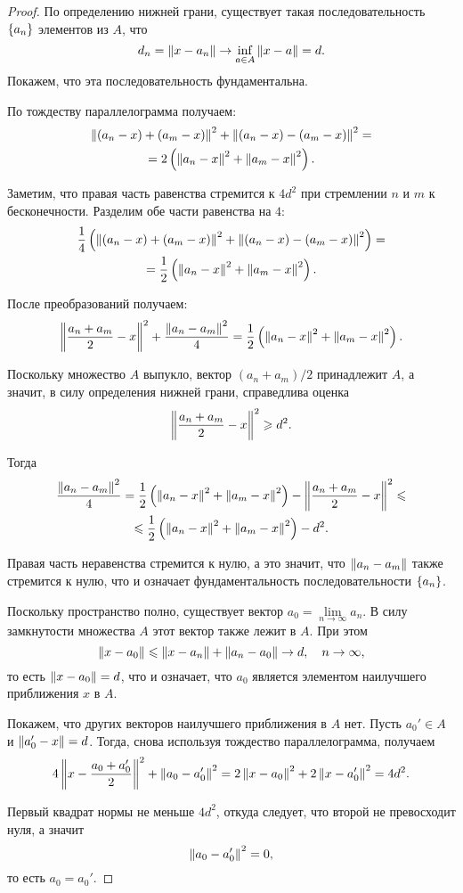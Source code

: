 \begin{proof}
    По определению нижней грани, существует такая последовательность $\left\{a_n\right\}$
    элементов из $A$, что 
    \[d_n = \left\|x - a_n\right\| \to \inf_{a\in A} \left\|x - a\right\| = d.\]
    Покажем, что эта последовательность фундаментальна.

    По тождеству параллелограмма получаем:
    \begin{multline*}
        \left\|(a_n - x) + (a_m - x)\right\|^2 + \left\|(a_n-x)-(a_m-x)\right\|^2 = \\ =
        2\left(\left\|a_n-x\right\|^2+\left\|a_m-x\right\|^2\right). 
    \end{multline*}

    Заметим, что правая часть равенства стремится к $4d^2$ при стремлении $n$ и
    $m$ к бесконечности. Разделим обе части равенства на $4$:
    \begin{multline*}
        \frac{1}{4}\left(\left\|(a_n - x) + (a_m - x)\right\|^2 +
        \left\|(a_n-x)-(a_m-x)\right\|^2\right) = \\ =
        \frac{1}{2}\left(\left\|a_n-x\right\|^2+\left\|a_m-x\right\|^2\right). 
    \end{multline*}

    После преобразований получаем:
    \[
        \left\|\frac{a_n+a_m}{2}-x\right\|^2+\frac{\left\|a_n-a_m\right\|^2}{4} =
        \frac{1}{2}\left(\left\|a_n-x\right\|^2+\left\|a_m-x\right\|^2\right).
    \]

    Поскольку множество $A$ выпукло, вектор $(a_n+a_m)/2$ принадлежит
    $A$, а значит, в силу определения нижней грани, справедлива оценка
    \[ \left\|\frac{a_n+a_m}{2}-x\right\|^2 \geqslant d^2. \]

    Тогда
    \begin{multline*}
        \frac{\left\|a_n-a_m\right\|^2}{4} =
        \frac{1}{2}\left(\left\|a_n-x\right\|^2+\left\|a_m-x\right\|^2\right) -
        \left\|\frac{a_n+a_m}{2}-x\right\|^2 \leqslant \\ \leqslant
        \frac{1}{2}\left(\left\|a_n-x\right\|^2+\left\|a_m-x\right\|^2\right) - d^2.
    \end{multline*}

    Правая часть неравенства стремится к нулю, а это значит, что
    $\left\|a_n-a_m\right\|$ также стремится к нулю, что и означает фундаментальность
    последовательности $\left\{a_n\right\}$.

    Поскольку пространство полно, существует вектор $a_0 =
    \lim\limits_{n\to \infty} a_n$. В силу замкнутости множества $A$ этот вектор также
    лежит в $A$. При этом
    \[ \left\|x-a_0\right\| \leqslant \left\|x-a_n\right\| + \left\|a_n-a_0\right\| \to d, \quad n \to
    \infty, \]
    то есть $\left\|x - a_0\right\| = d$, что и означает, что $a_0$ является элементом
    наилучшего приближения $x$ в $A$.

    Покажем, что других векторов наилучшего приближения в $A$ нет. Пусть $a_0'
    \in A$ и $\left\|a_0' - x\right\| = d$. Тогда, снова используя тождество
    параллелограмма, получаем
    \[ 4 \left\|x - \frac{a_0+a_0'}{2}\right\|^2 + \left\|a_0 - a_0'\right\|^2 = 2 \left\|x -
    a_0\right\|^2 + 2 \left\|x - a_0'\right\|^2 = 4d^2.\]

    Первый квадрат нормы не меньше $4d^2$, откуда следует, что второй не
    превосходит нуля, а значит
    \[ \left\|a_0-a_0'\right\|^2 = 0, \]
    то есть $a_0 = a_0'$.
\end{proof}

